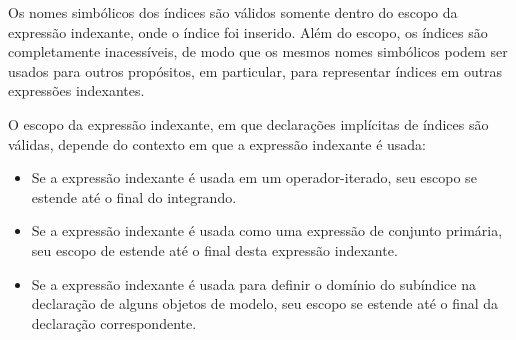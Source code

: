 \documentclass[11pt, brazil]{report}
\begin{document}

Os nomes simbólicos dos índices são válidos somente dentro do escopo
da expressão indexante, onde o índice foi inserido. Além do escopo,
os índices são completamente inacessíveis, de modo que os mesmos
nomes simbólicos podem ser usados para outros propósitos, em particular,
para representar índices em outras expressões indexantes.


O escopo da expressão indexante, em que declarações implícitas de índices
são válidas, depende do contexto em que a expressão indexante é usada:


\vspace*{-8pt}

\begin{itemize}
\item Se a expressão indexante é usada em um operador-iterado, seu
escopo se estende até o final do integrando.
\item Se a expressão indexante é usada como uma expressão de conjunto
primária, seu escopo de estende até o final desta expressão indexante.
\item Se a expressão indexante é usada para definir o domínio do subíndice
na declaração de alguns objetos de modelo, seu escopo se estende até o
final da declaração correspondente.
\end{itemize}

\end{document}
